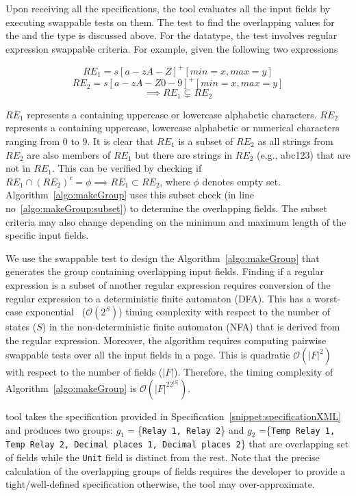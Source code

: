 Upon receiving all the specifications, the tool evaluates all the input fields by executing swappable tests on them. The test to find the overlapping values for the \integer and the \float type is discussed above. For the \String datatype, the test involves regular expression swappable criteria. For example, given the following two expressions

\[
RE_1 = s[a-zA-Z]^+[min=x, max=y]
\] 
\[
 RE_2 = s[a-zA-Z0-9]^+[min=x, max=y]
\]
\[ \implies RE_1 \subsetneq  RE_2
\]

$RE_1$ represents a \String containing uppercase or lowercase alphabetic characters. $RE_2$ represents a \String containing uppercase, lowercase alphabetic or numerical characters ranging from $0$ to $9$. It is clear that $RE_1$ is a subset of $RE_2$ as all strings from $RE_2$ are also members of $RE_1$ but there are strings in $RE_2$ (e.g., abc123) that are not in $RE_1$. This can be verified by checking if $RE_1\cap (RE_2)^c = \phi \implies RE_1 \subset RE_2$, where $\phi$ denotes empty set. Algorithm~\ref{algo:makeGroup} uses this subset check (in line no~\ref{algo:makeGroup:subset}) to determine the overlapping fields.
The subset criteria may also change depending on the minimum and maximum length of the specific input fields.
 
We use the swappable test to design the Algorithm~\ref{algo:makeGroup} that generates the group containing overlapping input fields. Finding if a regular expression is a subset of another regular expression requires conversion of the regular expression to a deterministic finite automaton (DFA). This has a worst-case exponential~\cite{Salomaa1997} ($\mathcal{O}(2^S)$) timing complexity with respect to the number of states ($S$) in the non-deterministic finite automaton (NFA) that is derived from the regular expression. Moreover, the algorithm requires computing pairwise swappable tests over all the input fields in a page. This is quadratic $\mathcal{O}(|F|^2)$ with respect to the number of fields ($|F|$). Therefore, the timing complexity of Algorithm~\ref{algo:makeGroup} is $\mathcal{O}(|F|^22^{|S|})$. %

\tool tool takes the specification provided in  Specification~\ref{snippet:specificationXML} and produces two groups:  $g_1=$\{\texttt{Relay 1, Relay 2}\} and $g_2$ =\{\texttt{Temp Relay 1, Temp Relay 2, Decimal places 1, Decimal places 2}\} that are overlapping set of fields while the \texttt{Unit} field is distinct from the rest. Note that the precise calculation of the overlapping groups of fields requires the developer to provide a tight/well-defined specification otherwise, the \tool tool may over-approximate.

